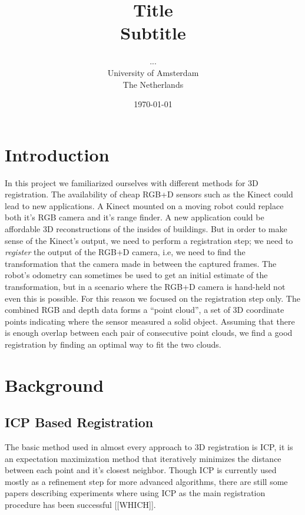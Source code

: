\documentclass[a4paper]{article}
\title{Title\\
{\large Subtitle}}
\author{...\\
  University of Amsterdam\\
  The Netherlands}
\date{\today}
\begin{document}
\maketitle



\section{Introduction}

In this project we familiarized ourselves with different methods for 3D registration. The availability of cheap RGB+D sensors such as the Kinect could lead to new applications. A Kinect mounted on a moving robot could replace both it's RGB camera and it's range finder. A new application could be affordable 3D reconstructions of the insides of buildings. But in order to make sense of the Kinect's output, we need to perform a registration step; we need to \emph{register} the output of the RGB+D camera, i.e, we need to find the transformation that the camera made in between the captured frames. The robot's odometry can sometimes be used to get an initial estimate of the transformation, but in a scenario where the RGB+D camera is hand-held not even this is possible. For this reason we focused on the registration step only. The combined RGB and depth data forms a ``point cloud'', a set of 3D coordinate points indicating where the sensor measured a solid object. Assuming that there is enough overlap between each pair of consecutive point clouds, we find a good registration by finding an optimal way to fit the two clouds.

\section{Background}

\subsection{ICP Based Registration}

The basic method used in almost every approach to 3D registration is \ac{ICP}\cite{besl1992method}, it is an expectation maximization method that iteratively minimizes the distance between each point and it's closest neighbor. Though \ac{ICP} is currently used mostly as a refinement step for more advanced algorithms, there are still some papers describing experiments where using \ac{ICP} as the main registration procedure has been successful [[WHICH]]. 
\end{document}
